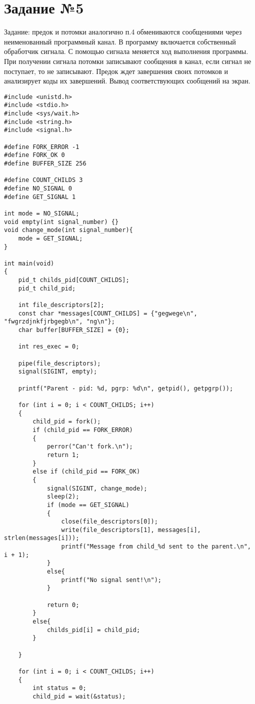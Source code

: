 \chapter*{Задание №5}
Задание: предок и потомки аналогично п.4 обмениваются сообщениями через неименованный программный канал. В программу включается собственный обработчик сигнала. С помощью сигнала меняется ход выполнения программы. При получении сигнала потомки записывают сообщения в канал, если сигнал не поступает, то не записывают. Предок ждет завершения своих потомков и анализирует коды их завершений. Вывод соответствующих сообщений на экран.

\begin{lstlisting}[label = exec, caption=Использование сигнала.]
#include <unistd.h>
#include <stdio.h>
#include <sys/wait.h>
#include <string.h>
#include <signal.h>

#define FORK_ERROR -1
#define FORK_OK 0
#define BUFFER_SIZE 256

#define COUNT_CHILDS 3
#define NO_SIGNAL 0
#define GET_SIGNAL 1

int mode = NO_SIGNAL;
void empty(int signal_number) {}
void change_mode(int signal_number){
	mode = GET_SIGNAL;
}

int main(void)
{
	pid_t childs_pid[COUNT_CHILDS];
	pid_t child_pid;
	
	int file_descriptors[2];
	const char *messages[COUNT_CHILDS] = {"gegwege\n", "fwgrzdjnkfjrbgegb\n", "ng\n"};
	char buffer[BUFFER_SIZE] = {0};
	
	int res_exec = 0;
	
	pipe(file_descriptors);
	signal(SIGINT, empty);
	
	printf("Parent - pid: %d, pgrp: %d\n", getpid(), getpgrp());
	
	for (int i = 0; i < COUNT_CHILDS; i++)
	{
		child_pid = fork();
		if (child_pid == FORK_ERROR)
		{
			perror("Can't fork.\n");
			return 1;
		}
		else if (child_pid == FORK_OK)
		{
			signal(SIGINT, change_mode);
			sleep(2);
			if (mode == GET_SIGNAL)
			{
				close(file_descriptors[0]);
				write(file_descriptors[1], messages[i], strlen(messages[i]));
				printf("Message from child_%d sent to the parent.\n", i + 1);
			}
			else{
				printf("No signal sent!\n");
			}
			
			return 0;
		}
		else{
			childs_pid[i] = child_pid;
		}
		
	}
	
	for (int i = 0; i < COUNT_CHILDS; i++)
	{
		int status = 0;
		child_pid = wait(&status);
		

\end{lstlisting}
